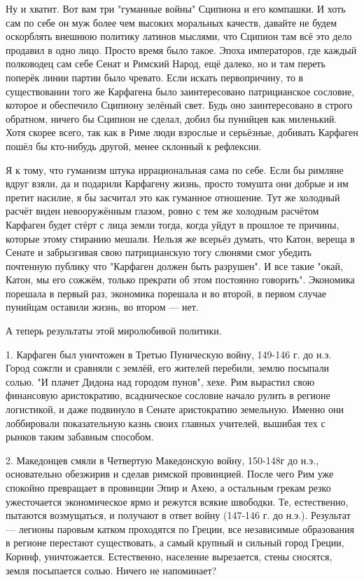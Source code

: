 Ну и хватит. Вот вам три "гуманные войны" Сципиона и его компашки. И хоть сам по себе он муж более чем высоких моральных качеств, давайте не будем оскорблять внешнюю политику латинов мыслями, что Сципион там всё это дело продавил в одно лицо. Просто время было такое. Эпоха императоров, где каждый полководец сам себе Сенат и Римский Народ, ещё далеко, но и там переть поперёк линии партии было чревато. Если искать первопричину, то в существовании того же Карфагена было заинтересовано патрицианское сословие, которое и обеспечило Сципиону зелёный свет. Будь оно заинтересовано в строго обратном, ничего бы Сципион не сделал, добил бы пунийцев как миленький. Хотя скорее всего, так как в Риме люди взрослые и серьёзные, добивать Карфаген пошёл бы кто-нибудь другой, менее склонный к рефлексии.


Я к тому, что гуманизм штука иррациональная сама по себе. Если бы римляне вдруг взяли, да и подарили Карфагену жизнь, просто томушта они добрые и им претит насилие, я бы засчитал это как гуманное отношение. Тут же холодный расчёт виден невооружённым глазом, ровно с тем же холодным расчётом Карфаген будет стёрт с лица земли тогда, когда уйдут в прошлое те причины, которые этому стиранию мешали. Нельзя же всерьёз думать, что Катон, вереща в Сенате и забрызгивая свою патрицианскую тогу слюнями смог убедить почтенную публику что "Карфаген должен быть разрушен". И все такие "окай, Катон, мы его сожжём, только прекрати об этом постоянно говорить". Экономика порешала в первый раз, экономика порешала и во второй, в первом случае пунийцам оставили жизнь, во втором — нет.


А теперь результаты этой миролюбивой политики.


1. Карфаген был уничтожен в Третью Пуническую войну, 149-146 г. до н.э. Город сожгли и сравняли с землёй, его жителей перебили, землю посыпали солью. "И плачет Дидона над городом пунов", хехе. Рим вырастил свою финансовую аристократию, всадническое сословие начало рулить в регионе логистикой, и даже подвинуло в Сенате аристократию земельную. Именно они лоббировали показательную казнь своих главных учителей, вышибая тех с рынков таким забавным способом.


2. Македонцев смяли в Четвертую Македонскую войну, 150-148г до н.э., основательно обезжирив и сделав римской провинцией. После чего Рим уже спокойно превращает в провинции Эпир и Ахею, а остальным грекам резко ужесточается экономическое ярмо и режутся всякие швободки. Те, естественно, пытаются возмущаться, и получают в ответ войну (147-146 г. до н.э.). Результат — легионы паровым катком проходятся по Греции, все независимые образования в регионе перестают существовать, а самый крупный и сильный город Греции, Коринф, уничтожается. Естественно, население вырезается, стены сносятся, земля посыпается солью. Ничего не напоминает?


